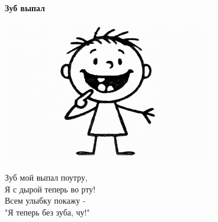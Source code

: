 \vspace*{\fill}
\begin{center}
  {\huge\textbf{Зуб выпал}}

  \vspace{1.5em}  \includegraphics[width=0.7\textwidth]{pictures/tooth.png}
  \vspace{4em}
  \parbox{0.6\textwidth}{
    \LARGE
    \begin{spacing}{1.2}
      Зуб мой выпал поутру,\\
      Я с дырой теперь во рту!\\
      Всем улыбку покажу - \\
      "Я теперь без зуба, чу!" %
    \end{spacing}
      
  }
\end{center}
\vspace*{\fill}